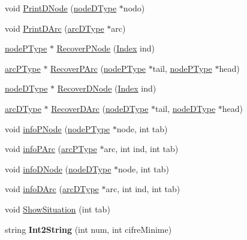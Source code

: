 \begin{DoxyCompactItemize}
\item 
void \mbox{\hyperlink{class_m_c_f_simplex_a55930c644c916a627a4eb7ff5c965e2a}{Print\+D\+Node}} (\mbox{\hyperlink{struct_m_c_f_simplex_1_1node_d_type}{node\+D\+Type}} $\ast$nodo)
\item 
void \mbox{\hyperlink{class_m_c_f_simplex_a7852f297fc43c2304256e63ce40fd71b}{Print\+D\+Arc}} (\mbox{\hyperlink{struct_m_c_f_simplex_1_1arc_d_type}{arc\+D\+Type}} $\ast$arc)
\item 
\mbox{\hyperlink{struct_m_c_f_simplex_1_1node_p_type}{node\+P\+Type}} $\ast$ \mbox{\hyperlink{class_m_c_f_simplex_a28596ee71a4238aeb935ac426c8c21c4}{Recover\+P\+Node}} (\mbox{\hyperlink{class_m_c_f_class_ad53d6229d7ec28555a9c9c2fd9abf773}{Index}} ind)
\item 
\mbox{\hyperlink{struct_m_c_f_simplex_1_1arc_p_type}{arc\+P\+Type}} $\ast$ \mbox{\hyperlink{class_m_c_f_simplex_a16406161e6cc93f61f6a20edbbe0bc75}{Recover\+P\+Arc}} (\mbox{\hyperlink{struct_m_c_f_simplex_1_1node_p_type}{node\+P\+Type}} $\ast$tail, \mbox{\hyperlink{struct_m_c_f_simplex_1_1node_p_type}{node\+P\+Type}} $\ast$head)
\item 
\mbox{\hyperlink{struct_m_c_f_simplex_1_1node_d_type}{node\+D\+Type}} $\ast$ \mbox{\hyperlink{class_m_c_f_simplex_ad45095829e1ad1e222240c64cf7780ee}{Recover\+D\+Node}} (\mbox{\hyperlink{class_m_c_f_class_ad53d6229d7ec28555a9c9c2fd9abf773}{Index}} ind)
\item 
\mbox{\hyperlink{struct_m_c_f_simplex_1_1arc_d_type}{arc\+D\+Type}} $\ast$ \mbox{\hyperlink{class_m_c_f_simplex_acd4ca9a93468922d29b4f57f17e1324d}{Recover\+D\+Arc}} (\mbox{\hyperlink{struct_m_c_f_simplex_1_1node_d_type}{node\+D\+Type}} $\ast$tail, \mbox{\hyperlink{struct_m_c_f_simplex_1_1node_d_type}{node\+D\+Type}} $\ast$head)
\item 
void \mbox{\hyperlink{class_m_c_f_simplex_addd6da25d7293e26c4dd504dff1f6f49}{info\+P\+Node}} (\mbox{\hyperlink{struct_m_c_f_simplex_1_1node_p_type}{node\+P\+Type}} $\ast$node, int tab)
\item 
void \mbox{\hyperlink{class_m_c_f_simplex_ad361e52be6859383c382c92b9c466114}{info\+P\+Arc}} (\mbox{\hyperlink{struct_m_c_f_simplex_1_1arc_p_type}{arc\+P\+Type}} $\ast$arc, int ind, int tab)
\item 
void \mbox{\hyperlink{class_m_c_f_simplex_a38dc7bc8f5eba5cbbb1cbaac22c94eec}{info\+D\+Node}} (\mbox{\hyperlink{struct_m_c_f_simplex_1_1node_d_type}{node\+D\+Type}} $\ast$node, int tab)
\item 
void \mbox{\hyperlink{class_m_c_f_simplex_af2186258fb5ad398102bb7a6c1cfdce7}{info\+D\+Arc}} (\mbox{\hyperlink{struct_m_c_f_simplex_1_1arc_d_type}{arc\+D\+Type}} $\ast$arc, int ind, int tab)
\item 
void \mbox{\hyperlink{class_m_c_f_simplex_a949fac27f80532ba4d8584fbc57a2aaf}{Show\+Situation}} (int tab)
\item 
\mbox{\label{class_m_c_f_simplex_a6cfeb4f996b1a86f5201dd57a3e06100}} 
string {\bfseries Int2\+String} (int num, int cifre\+Minime)
\end{DoxyCompactItemize}
